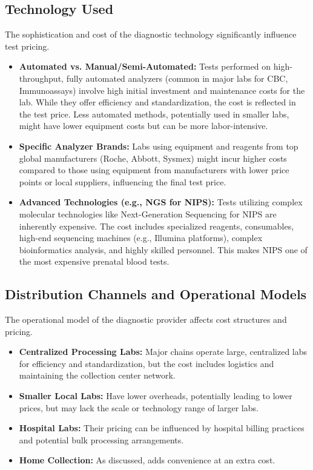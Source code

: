 \documentclass{article}
\begin{document}
\subsection{Technology Used}
The sophistication and cost of the diagnostic technology significantly influence test pricing.
\begin{itemize}
    \item \textbf{Automated vs. Manual/Semi-Automated:} Tests performed on high-throughput, fully automated analyzers (common in major labs for CBC, Immunoassays) involve high initial investment and maintenance costs for the lab. While they offer efficiency and standardization, the cost is reflected in the test price. Less automated methods, potentially used in smaller labs, might have lower equipment costs but can be more labor-intensive.
    \item \textbf{Specific Analyzer Brands:} Labs using equipment and reagents from top global manufacturers (Roche, Abbott, Sysmex) might incur higher costs compared to those using equipment from manufacturers with lower price points or local suppliers, influencing the final test price.
    \item \textbf{Advanced Technologies (e.g., NGS for NIPS):} Tests utilizing complex molecular technologies like Next-Generation Sequencing for NIPS are inherently expensive. The cost includes specialized reagents, consumables, high-end sequencing machines (e.g., Illumina platforms), complex bioinformatics analysis, and highly skilled personnel. This makes NIPS one of the most expensive prenatal blood tests.
\end{itemize}

\subsection{Distribution Channels and Operational Models}
The operational model of the diagnostic provider affects cost structures and pricing.
\begin{itemize}
    \item \textbf{Centralized Processing Labs:} Major chains operate large, centralized labs for efficiency and standardization, but the cost includes logistics and maintaining the collection center network.
    \item \textbf{Smaller Local Labs:} Have lower overheads, potentially leading to lower prices, but may lack the scale or technology range of larger labs.
    \item \textbf{Hospital Labs:} Their pricing can be influenced by hospital billing practices and potential bulk processing arrangements.
    \item \textbf{Home Collection:} As discussed, adds convenience at an extra cost.
\end{itemize}
\end{document}
